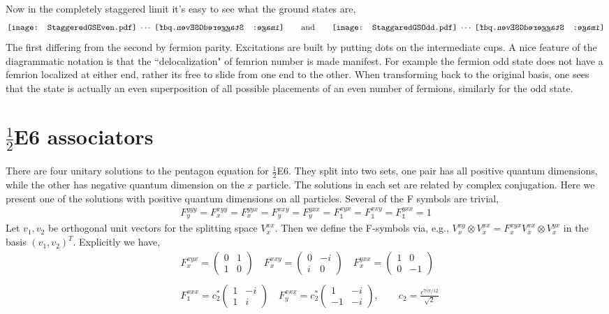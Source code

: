 \documentclass[12pt,a4paper]{article}
\newcommand{\tp}{\otimes}
\newcommand{\StaggaredGSOdd}{\mathord{\vcenter{\hbox{\texttt{[image: StaggaredGSOdd.pdf]}}}}}
\newcommand{\StaggaredGSEven}{\mathord{\vcenter{\hbox{\texttt{[image: StaggeredGSEven.pdf]}}}}}
\newcommand{\StaggaredGSEvenR}{\mathord{\vcenter{\hbox{\reflectbox{\texttt{[image: StaggeredGSEven.pdf]}}}}}}
\begin{document}
Now in the completely staggered limit it's easy to see what the ground states are,
\begin{align}
\StaggaredGSEven \; \cdots \; \StaggaredGSEvenR  
\qquad \text{and} \qquad 
\StaggaredGSOdd \; \cdots  \; \StaggaredGSEvenR
\end{align}
The first differing from the second by fermion parity.
Excitations are built by putting dots on the intermediate cups. 
A nice feature of the diagrammatic notation is that the ``delocalization" of femrion number is made manifest.
For example the fermion odd state does not have a femrion localized at either end, rather its free to slide from one end to the other.
When transforming back to the original basis, one sees that the state is actually an even superposition of all possible placements of an even number of fermions, similarly for the odd state.

\section{$\frac{1}{2}$E6 associators}
\label{E6Fsymbols}
There are four unitary solutions to the pentagon equation for $\frac{1}{2}$E6. They split into two sets, one pair has all positive quantum dimensions, while the other has negative quantum dimension on the $x$ particle. 
The solutions in each set are related by complex conjugation. 
Here we present one of the solutions with positive quantum dimensions on all particles. 
Several of the F symbols are trivial,
\begin{align}
F^{yyy}_y = F^{xyy}_x = F^{yyx}_x = F^{xxy}_y  = F^{yxx}_y = F^{xyx}_{\mathds{1}} = F^{xxy}_{\mathds{1}} = F^{yxx}_{\mathds{1}}= 1
\end{align}
Let $v_1, v_2$ be orthogonal unit vectors for the splitting space $V^{xx}_x$. 
Then we define the F-symbols via, e.g., $V^{xy}_x \tp V^{xx}_x  = F^{xyx}_x V^{xx}_x \tp V^{yx}_x$ in the basis $(v_1, v_2)^{T}$.
Explicitly we have,
\begin{align}
&F^{xyx}_x = \left(\begin{matrix}
0&1\\
1&0
\end{matrix} \right) \quad
F^{xxy}_x = \left(\begin{matrix}
0&-i\\
i&0
\end{matrix} \right) \quad
F^{yxx}_x = \left(\begin{matrix}
1&0\\
0&-1
\end{matrix} \right) 
\\
\\
&F^{xxx}_{\mathds{1}} = c_2^* \left(\begin{matrix}
1&-i\\
1&i
\end{matrix} \right) \quad
F^{xxx}_y = c_2^*\left(\begin{matrix}
1&-i\\
-1&-i
\end{matrix} \right), \quad \quad c_2  = \frac{e^{7 i \pi/12}}{\sqrt{2}}
\end{align}
\end{document}
